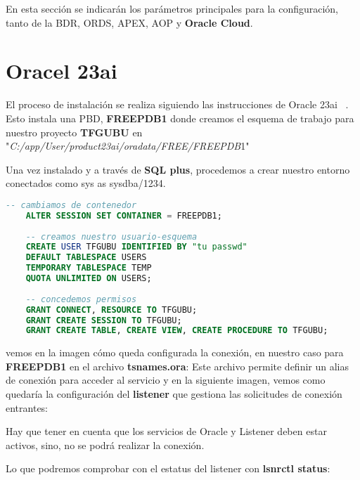 
En esta sección se indicarán los parámetros principales para la configuración, tanto de la \acrshort{BDR}, \acrshort{ORDS}, \acrshort{APEX}, \acrshort{AOP} y \textbf{Oracle Cloud}.

\section{Oracel 23ai}
El proceso de instalación se realiza siguiendo las instrucciones de Oracle 23ai ~\cite{DattaInstallingOracleDatabasea}.
Esto instala una \acrfull{PBD}, \textbf{\textbf{FREEPDB1}} donde creamos el esquema de trabajo para nuestro proyecto \textbf{TFGUBU} en "\textit{C:/app/User/product23ai/oradata/FREE/FREEPDB}1"

Una vez instalado y a través de \textbf{SQL plus}, procedemos a crear nuestro entorno conectados como sys as sysdba/1234.
\begin{lstlisting}[language=SQL, caption={Creación de Esquema TFGUBU}]
	-- cambiamos de contenedor
	ALTER SESSION SET CONTAINER = FREEPDB1;
	
	-- creamos nuestro usuario-esquema
	CREATE USER TFGUBU IDENTIFIED BY "tu passwd"
	DEFAULT TABLESPACE USERS
	TEMPORARY TABLESPACE TEMP
	QUOTA UNLIMITED ON USERS;
	
	-- concedemos permisos
	GRANT CONNECT, RESOURCE TO TFGUBU;
	GRANT CREATE SESSION TO TFGUBU;
	GRANT CREATE TABLE, CREATE VIEW, CREATE PROCEDURE TO TFGUBU;
\end{lstlisting}

vemos en la imagen cómo queda configurada la conexión, en nuestro caso para \textbf{FREEPDB1} en el archivo \textbf{tsnames.ora}:
Este archivo permite definir un alias de conexión para acceder al servicio y en la siguiente imagen, vemos como quedaría la configuración del \textbf{listener} que gestiona las solicitudes de conexión entrantes:

Hay que tener en cuenta que los servicios de Oracle y Listener deben estar activos, sino, no se podrá realizar la conexión.


Lo que podremos comprobar con el estatus del listener con \textbf{lsnrctl status}:


